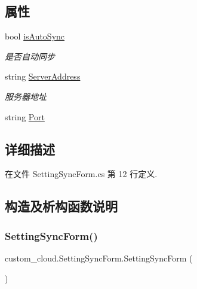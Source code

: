 \subsection*{属性}
\begin{DoxyCompactItemize}
\item 
bool \hyperlink{classcustom__cloud_1_1_setting_sync_form_ae122f79caf78c5af0d52c25d60488559}{is\+Auto\+Sync}
\begin{DoxyCompactList}\small\item\em 是否自动同步 \end{DoxyCompactList}\item 
string \hyperlink{classcustom__cloud_1_1_setting_sync_form_a42d4a867b5073ec8c0e1259412989c10}{Server\+Address}
\begin{DoxyCompactList}\small\item\em 服务器地址 \end{DoxyCompactList}\item 
string \hyperlink{classcustom__cloud_1_1_setting_sync_form_a3820352141ce5448660dde19a32e132a}{Port}
\end{DoxyCompactItemize}


\subsection{详细描述}


在文件 Setting\+Sync\+Form.\+cs 第 12 行定义.



\subsection{构造及析构函数说明}
\mbox{\label{classcustom__cloud_1_1_setting_sync_form_ade8e45be1db57b6a1e8d32deb94af748}} 
\subsubsection{\texorpdfstring{Setting\+Sync\+Form()}{SettingSyncForm()}}
{\footnotesize\ttfamily custom\+\_\+cloud.\+Setting\+Sync\+Form.\+Setting\+Sync\+Form (\begin{DoxyParamCaption}{ }\end{DoxyParamCaption})}



